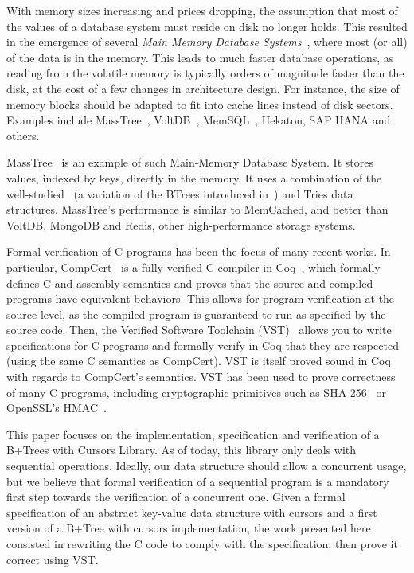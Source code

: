   With memory sizes increasing and prices dropping, the assumption that most of the values of a database system must reside on disk no longer holds.
  This resulted in the emergence of several \textit{Main Memory Database Systems}~\cite{mmdb}, where most (or all) of the data is in the memory.
  This leads to much faster database operations, as reading from the volatile memory is typically orders of magnitude faster than the disk, at the cost of a few changes in architecture design.
  For instance, the size of memory blocks should be adapted to fit into cache lines instead of disk sectors.
  Examples include MassTree~\cite{masstree}, VoltDB~\cite{voltdb}, MemSQL~\cite{memsql}, Hekaton, SAP HANA and others.

  MassTree~\cite{masstree} is an example of such Main-Memory Database System.
  It stores values, indexed by keys, directly in the memory.
  It uses a combination of the well-studied \btrees\ (a variation of the BTrees introduced in~\cite{btrees}) and Tries data structures.
  MassTree's performance is similar to MemCached, and better than VoltDB, MongoDB and Redis, other high-performance storage systems.

  Formal verification of C programs has been the focus of many recent works.
  In particular, CompCert~\cite{compcert,compcert2} is a fully verified C compiler in Coq~\cite{coq}, which formally defines C and assembly semantics and proves that the source and compiled programs have equivalent behaviors.
  This allows for program verification at the source level, as the compiled program is guaranteed to run as specified by the source code.
  Then, the Verified Software Toolchain (VST)~\cite{vst} allows you to write specifications for C programs and formally verify in Coq that they are respected (using the same C semantics as CompCert).
  VST is itself proved sound in Coq with regards to CompCert's semantics.
  VST has been used to prove correctness of many C programs, including cryptographic primitives such as SHA-256~\cite{sha} or OpenSSL's HMAC~\cite{hmac}.

  This paper focuses on the implementation, specification and verification of a B+Trees with Cursors Library.
  As of today, this library only deals with sequential operations.
  Ideally, our data structure should allow a concurrent usage, but we believe that formal verification of a sequential program is a mandatory first step towards the verification of a concurrent one.
  Given a formal specification of an abstract key-value data structure with cursors and a first version of a B+Tree with cursors implementation, the work presented here consisted in rewriting the C code to comply with the specification, then prove it correct using VST.

